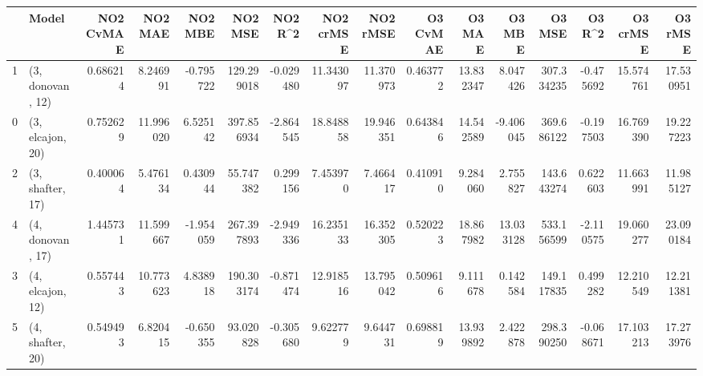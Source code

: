 \begin{tabular}{llrrrrrrrrrrrrrr}
\toprule
{} &             Model &  NO2 CvMAE &    NO2 MAE &   NO2 MBE &     NO2 MSE &   NO2 R\textasciicircum2 &  NO2 crMSE &   NO2 rMSE &  O3 CvMAE &     O3 MAE &     O3 MBE &      O3 MSE &    O3 R\textasciicircum2 &   O3 crMSE &    O3 rMSE \\
\midrule
1 &  (3, donovan, 12) &   0.686214 &   8.246991 & -0.795722 &  129.299018 & -0.029480 &  11.343097 &  11.370973 &  0.463772 &  13.832347 &   8.047426 &  307.334235 & -0.475692 &  15.574761 &  17.530951 \\
0 &  (3, elcajon, 20) &   0.752629 &  11.996020 &  6.525142 &  397.856934 & -2.864545 &  18.848858 &  19.946351 &  0.643846 &  14.542589 &  -9.406045 &  369.686122 & -0.197503 &  16.769390 &  19.227223 \\
2 &  (3, shafter, 17) &   0.400064 &   5.476134 &  0.430944 &   55.747382 &  0.299156 &   7.453970 &   7.466417 &  0.410910 &   9.284060 &   2.755827 &  143.643274 &  0.622603 &  11.663991 &  11.985127 \\
4 &  (4, donovan, 17) &   1.445731 &  11.599667 & -1.954059 &  267.397893 & -2.949336 &  16.235133 &  16.352305 &  0.520223 &  18.867982 &  13.033128 &  533.156599 & -2.110575 &  19.060277 &  23.090184 \\
3 &  (4, elcajon, 12) &   0.557443 &  10.773623 &  4.838918 &  190.303174 & -0.871474 &  12.918516 &  13.795042 &  0.509616 &   9.111678 &   0.142584 &  149.117835 &  0.499282 &  12.210549 &  12.211381 \\
5 &  (4, shafter, 20) &   0.549493 &   6.820415 & -0.650355 &   93.020828 & -0.305680 &   9.622779 &   9.644731 &  0.698819 &  13.939892 &   2.422878 &  298.390250 & -0.068671 &  17.103213 &  17.273976 \\
\bottomrule
\end{tabular}
